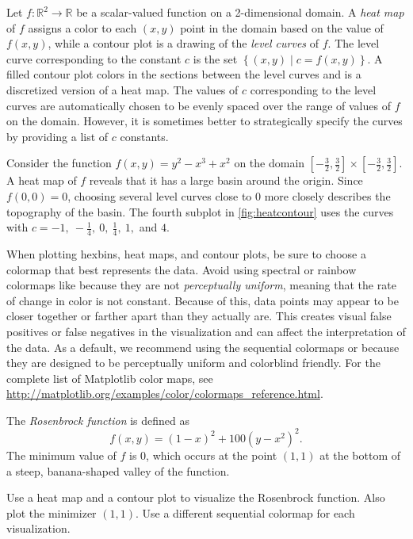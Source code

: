 Let $f:\mathbb{R}^2\rightarrow\mathbb{R}$ be a scalar-valued function on a 2-dimensional domain.
A \emph{heat map} of $f$ assigns a color to each $(x,y)$ point in the domain based on the value of $f(x,y)$, while a contour plot is a drawing of the \emph{level curves} of $f$.
The level curve corresponding to the constant $c$ is the set $\left\{(x,y)\mid c = f(x,y)\right\}$.
A filled contour plot colors in the sections between the level curves and is a discretized version of a heat map.
The values of $c$ corresponding to the level curves are automatically chosen to be evenly spaced over the range of values of $f$ on the domain.
However, it is sometimes better to strategically specify the curves by providing a list of $c$ constants.

Consider the function $f(x,y) = y^2 - x^3 + x^2$ on the domain $[-\frac{3}{2}, \frac{3}{2}] \times [-\frac{3}{2}, \frac{3}{2}]$.
A heat map of $f$ reveals that it has a large basin around the origin.
Since $f(0,0) = 0$, choosing several level curves close to $0$ more closely describes the topography of the basin.
The fourth subplot in \ref{fig:heatcontour} uses the curves with $c = -1,\ -\frac{1}{4},\ 0,\ \frac{1}{4},\ 1,$ and $4$.

When plotting hexbins, heat maps, and contour plots, be sure to choose a colormap that best represents the data.
Avoid using spectral or rainbow colormaps like  because they are not \emph{perceptually uniform}, meaning that the rate of change in color is not constant.
Because of this, data points may appear to be closer together or farther apart than they actually are.
This creates visual false positives or false negatives in the visualization and can affect the interpretation of the data.
As a default, we recommend using the sequential colormaps  or  because they are designed to be perceptually uniform and colorblind friendly.
For the complete list of Matplotlib color maps, see \url{http://matplotlib.org/examples/color/colormaps_reference.html}.

\begin{problem} %
The \emph{Rosenbrock function} is defined as
\[f(x,y) = (1-x)^2 + 100(y-x^2)^2.\]
The minimum value of $f$ is $0$, which occurs at the point $(1,1)$ at the bottom of a steep, banana-shaped valley of the function.

Use a heat map and a contour plot to visualize the Rosenbrock function.
Also plot the minimizer $(1,1)$.
Use a different sequential colormap for each visualization.
\end{problem}

